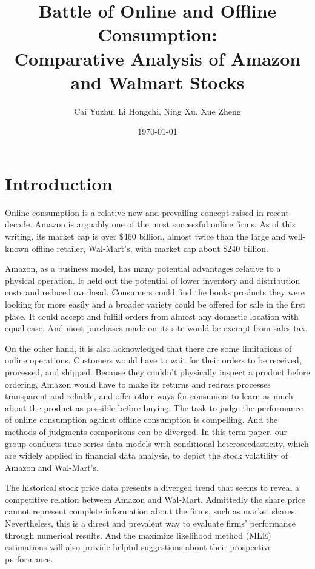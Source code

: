 \documentclass[paper=a4, fontsize=13pt]{article}
\title{
\normalfont \normalsize
\huge Battle of Online and Offline Consumption: \\
Comparative Analysis of Amazon and Walmart Stocks
}
\author{Cai Yuzhu, Li Hongchi, Ning Xu, Xue Zheng}
\date{\normalsize\today}
\begin{document}
\maketitle

\section{Introduction}
Online consumption is a relative new and prevailing concept raised in recent decade. Amazon is arguably one of the most successful online firms. As of this writing, its market cap is over \$460 billion, almost twice than the large and well-known offline retailer, Wal-Mart's, with market cap about \$240 billion.

Amazon, as a business model, has many potential advantages relative to a physical operation. It held out the potential of lower inventory and distribution costs and reduced overhead. Consumers could find the books products they were looking for more easily and a broader variety could be offered for sale in the first place. It could accept and fulfill orders from almost any domestic location with equal ease. And most purchases made on its site would be exempt from sales tax.

On the other hand, it is also acknowledged that there are some limitations of online operations. Customers would have to wait for their orders to be received, processed, and shipped. Because they couldn't physically inspect a product before ordering, Amazon would have to make its returns and redress processes transparent and reliable, and offer other ways for consumers to learn as much about the product as possible before buying.
The task to judge the performance of online consumption against offline consumption is compelling. And the methods of judgments comparisons can be diverged. In this term paper, our group conducts time series data models with conditional heteroscedasticity, which are widely applied in financial data analysis, to depict the stock volatility of Amazon and Wal-Mart's.

The historical stock price data presents a diverged trend that seems to reveal a competitive relation between Amazon and Wal-Mart. Admittedly the share price cannot represent complete information about the firms, such as market shares. Nevertheless, this is a direct and prevalent way to evaluate firms' performance through numerical results. And the maximize likelihood method (MLE) estimations will also provide helpful suggestions about their prospective performance.
\end{document}

